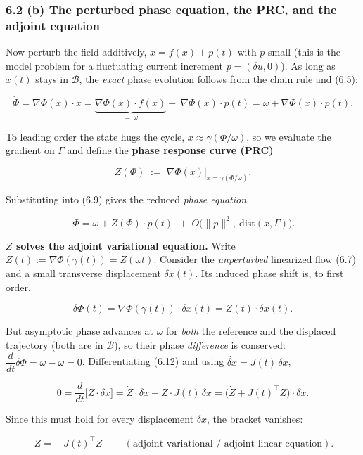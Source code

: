 \documentclass[
  11pt,
]{article}
\begin{document}
\subsubsection{6.2 (b) The perturbed phase equation, the PRC, and the
adjoint
equation}\label{b-the-perturbed-phase-equation-the-prc-and-the-adjoint-equation}

Now perturb the field additively, \(\dot x=f(x)+p(t)\) with \(p\) small
(this is the model problem for a fluctuating current increment
\(p=(\delta u,0)\)). As long as \(x(t)\) stays in \(\mathcal B\), the
\emph{exact} phase evolution follows from the chain rule and (6.5):

\[
\dot\Phi=\nabla\Phi(x)\cdot\dot x
=\underbrace{\nabla\Phi(x)\cdot f(x)}_{=\ \omega}
+\ \nabla\Phi(x)\cdot p(t)
=\omega+\nabla\Phi(x)\cdot p(t).
\tag{6.9}
\]

To leading order the state hugs the cycle,
\(x\approx\gamma(\Phi/\omega)\), so we evaluate the gradient on
\(\Gamma\) and define the \textbf{phase response curve (PRC)}

\[
Z(\Phi)\;:=\;\nabla\Phi(x)\big|_{x=\gamma(\Phi/\omega)} .
\tag{6.10}
\]

Substituting into (6.9) gives the reduced \emph{phase equation}

\[
\boxed{\ \dot\Phi=\omega+Z(\Phi)\cdot p(t)\ }\ +\ O\!\big(\|p\|^2,\ \mathrm{dist}(x,\Gamma)\big).
\tag{6.11}
\]

\textbf{\(Z\) solves the adjoint variational equation.} Write
\(Z(t):=\nabla\Phi(\gamma(t))=Z(\omega t)\). Consider the
\emph{unperturbed} linearized flow (6.7) and a small transverse
displacement \(\delta x(t)\). Its induced phase shift is, to first
order,

\[
\delta\Phi(t)=\nabla\Phi(\gamma(t))\cdot\delta x(t)=Z(t)\cdot\delta x(t).
\tag{6.12}
\]

But asymptotic phase advances at \(\omega\) for \emph{both} the
reference and the displaced trajectory (both are in \(\mathcal B\)), so
their phase \emph{difference} is conserved:
\(\dfrac{d}{dt}\delta\Phi=\omega-\omega=0\). Differentiating (6.12) and
using \(\dot{\delta x}=J(t)\,\delta x\),

\[
0=\frac{d}{dt}\big[Z\cdot\delta x\big]
=\dot Z\cdot\delta x+Z\cdot J(t)\,\delta x
=\big(\dot Z+J(t)^{\!\top}Z\big)\cdot\delta x .
\]

Since this must hold for every displacement \(\delta x\), the bracket
vanishes:

\[
\boxed{\ \dot Z=-\,J(t)^{\!\top}Z\ }\qquad(\text{adjoint variational / adjoint linear equation}).
\tag{6.13}
\]
\end{document}
